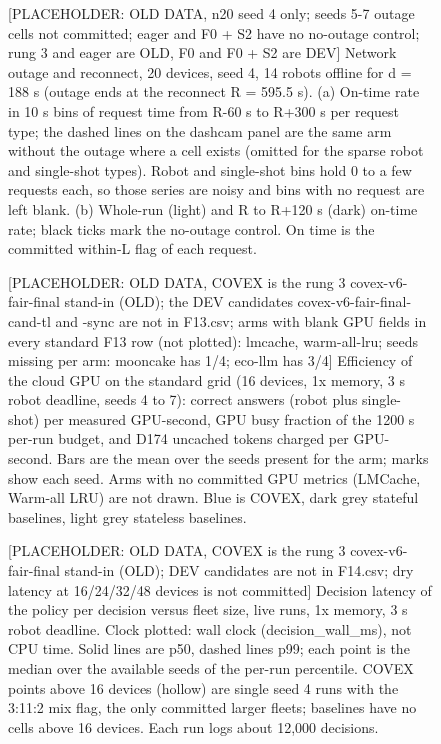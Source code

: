 \documentclass[sigconf]{acmart}
\begin{document}
\clearpage
\begin{figure}[t]
\centering
{\selectfont
}
\caption{[PLACEHOLDER: OLD DATA, n20 seed 4 only; seeds 5-7 outage cells not committed; eager and F0 + S2 have no no-outage control; rung 3 and eager are OLD, F0 and F0 + S2 are DEV] Network outage and reconnect, 20 devices, seed 4, 14 robots offline for d = 188 s (outage ends at the reconnect R = 595.5 s). (a) On-time rate in 10 s bins of request time from R-60 s to R+300 s per request type; the dashed lines on the dashcam panel are the same arm without the outage where a cell exists (omitted for the sparse robot and single-shot types). Robot and single-shot bins hold 0 to a few requests each, so those series are noisy and bins with no request are left blank. (b) Whole-run (light) and R to R+120 s (dark) on-time rate; black ticks mark the no-outage control. On time is the committed within-L flag of each request.}
\label{fig:F12_network}
\end{figure}
\clearpage
\begin{figure}[t]
\centering
{\selectfont
}
\caption{[PLACEHOLDER: OLD DATA, COVEX is the rung 3 covex-v6-fair-final stand-in (OLD); the DEV candidates covex-v6-fair-final-cand-tl and -sync are not in F13.csv; arms with blank GPU fields in every standard F13 row (not plotted): lmcache, warm-all-lru; seeds missing per arm: mooncake has 1/4; eco-llm has 3/4] Efficiency of the cloud GPU on the standard grid (16 devices, 1x memory, 3 s robot deadline, seeds 4 to 7): correct answers (robot plus single-shot) per measured GPU-second, GPU busy fraction of the 1200 s per-run budget, and D174 uncached tokens charged per GPU-second. Bars are the mean over the seeds present for the arm; marks show each seed. Arms with no committed GPU metrics (LMCache, Warm-all LRU) are not drawn. Blue is COVEX, dark grey stateful baselines, light grey stateless baselines.}
\label{fig:F13_gpu_efficiency}
\end{figure}
\clearpage
\begin{figure}[t]
\centering
{\selectfont
}
\caption{[PLACEHOLDER: OLD DATA, COVEX is the rung 3 covex-v6-fair-final stand-in (OLD); DEV candidates are not in F14.csv; dry latency at 16/24/32/48 devices is not committed] Decision latency of the policy per decision versus fleet size, live runs, 1x memory, 3 s robot deadline. Clock plotted: wall clock (decision\_wall\_ms), not CPU time. Solid lines are p50, dashed lines p99; each point is the median over the available seeds of the per-run percentile. COVEX points above 16 devices (hollow) are single seed 4 runs with the 3:11:2 mix flag, the only committed larger fleets; baselines have no cells above 16 devices. Each run logs about 12,000 decisions.}
\label{fig:F14_decision_latency}
\end{figure}
\end{document}
